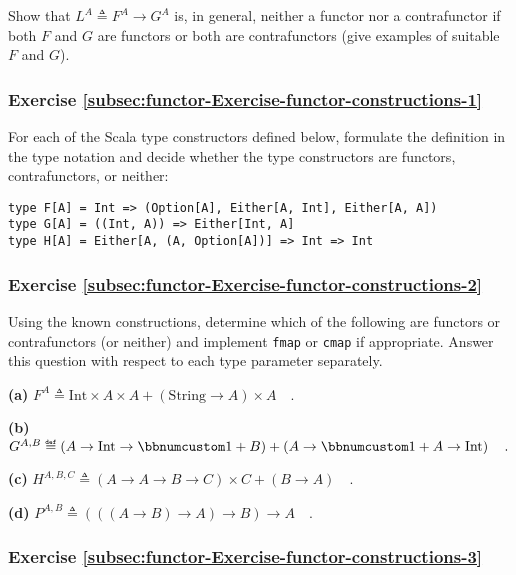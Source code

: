 Show that $L^{A}\triangleq F^{A}\rightarrow G^{A}$ is, in general,
neither a functor nor a contrafunctor if both $F$ and $G$ are functors
or both are contrafunctors (give examples of suitable $F$ and $G$).

\subsubsection{Exercise \label{subsec:functor-Exercise-functor-constructions-1}\ref{subsec:functor-Exercise-functor-constructions-1}}

For each of the Scala type constructors defined below, formulate the
definition in the type notation and decide whether the type constructors
are functors, contrafunctors, or neither:
\begin{lstlisting}
type F[A] = Int => (Option[A], Either[A, Int], Either[A, A])
type G[A] = ((Int, A)) => Either[Int, A]
type H[A] = Either[A, (A, Option[A])] => Int => Int
\end{lstlisting}


\subsubsection{Exercise \label{subsec:functor-Exercise-functor-constructions-2}\ref{subsec:functor-Exercise-functor-constructions-2}}

Using the known constructions, determine which of the following are
functors or contrafunctors (or neither) and implement \lstinline!fmap!
or \lstinline!cmap! if appropriate. Answer this question with respect
to each type parameter separately.

\textbf{(a)} $F^{A}\triangleq\text{Int}\times A\times A+(\text{String}\rightarrow A)\times A\quad.$

\textbf{(b)} $G^{A,B}\triangleq\left(A\rightarrow\text{Int}\rightarrow\bbnum 1+B\right)+\left(A\rightarrow\bbnum 1+A\rightarrow\text{Int}\right)\quad.$

\textbf{(c)} $H^{A,B,C}\triangleq\left(A\rightarrow A\rightarrow B\rightarrow C\right)\times C+\left(B\rightarrow A\right)\quad.$

\textbf{(d)} $P^{A,B}\triangleq\left(\left(\left(A\rightarrow B\right)\rightarrow A\right)\rightarrow B\right)\rightarrow A\quad.$

\subsubsection{Exercise \label{subsec:functor-Exercise-functor-constructions-3}\ref{subsec:functor-Exercise-functor-constructions-3}}


